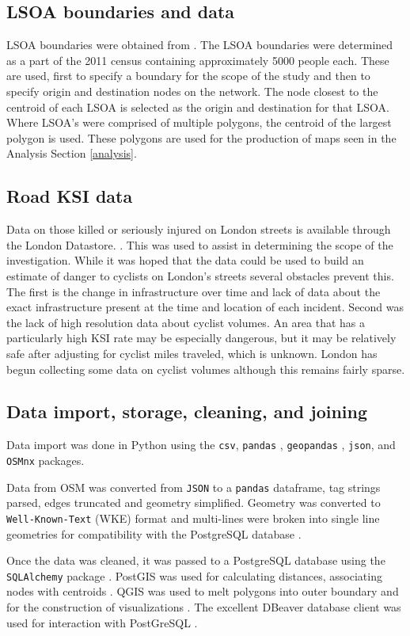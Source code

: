 \subsection{LSOA boundaries and data}
	
LSOA boundaries were obtained from  \textcite{lsoageoms}. The LSOA boundaries were determined as a part of the 2011 census containing approximately 5000 people each. These are used, first to specify a boundary for the scope of the study and then to specify origin and destination nodes on the network. The node closest to the centroid of each LSOA is selected as the origin and destination for that LSOA. Where LSOA's were comprised of multiple polygons, the centroid of the largest polygon is used. These polygons are used for the production of maps seen in the Analysis Section \ref{analysis}. 
	
\subsection{Road KSI data}

Data on those killed or seriously injured on London streets is available through the London Datastore. \parencite{cyclistksi}. This was used to assist in determining the scope of the investigation. While it was hoped that the data could be used to build an estimate of danger to cyclists on London's streets several obstacles prevent this. The first is the change in infrastructure over time and lack of data about the exact infrastructure present at the time and location of each incident. Second was the lack of high resolution data about cyclist volumes. An area that has a particularly high KSI rate may be especially dangerous, but it may be relatively safe after adjusting for cyclist miles traveled, which is unknown. London has begun collecting some data on cyclist volumes although this remains fairly sparse. 
	
\subsection{Data import, storage, cleaning, and joining}

Data import was done in Python \parencite{python} using the \texttt{csv}, \texttt{pandas} \parencite{pandas}, \texttt{geopandas} \parencite{geopandas}, \texttt{json}, and \texttt{OSMnx} \parencite{osmnx} packages. 

Data from OSM was converted from \texttt{JSON} to a \texttt{pandas} dataframe, tag strings parsed, edges truncated and geometry simplified. Geometry was converted to \texttt{Well-Known-Text} (WKE) format and multi-lines were broken into single line geometries for compatibility with the PostgreSQL database \parencite{postgres}. 

Once the data was cleaned, it was passed to a PostgreSQL database using the \texttt{SQLAlchemy} package \parencite{bayer2010sqlalchemy}. PostGIS was used for calculating distances, associating nodes with centroids \parencite{postgis}. QGIS was used to melt polygons into outer boundary and for the construction of visualizations \parencite{qgis}. The excellent DBeaver database client was used for interaction with PostGreSQL \parencite{dbeaver}.